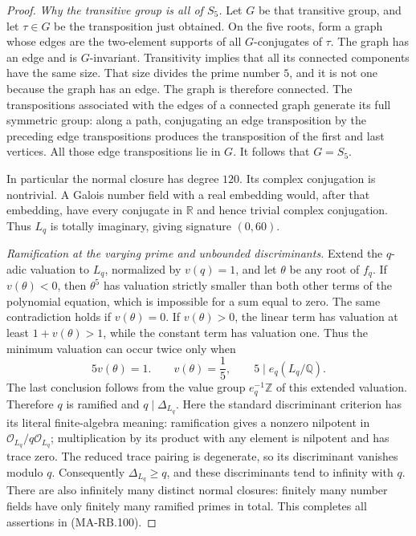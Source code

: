 \begin{proof}
\emph{Why the transitive group is all of \(S_5\).}
Let \(G\) be that transitive group, and let
\(\tau\in G\) be the transposition just obtained.
On the five roots, form a graph whose edges are
the two-element supports of all \(G\)-conjugates
of \(\tau\). The graph has an edge and is
\(G\)-invariant. Transitivity implies that all
its connected components have the same size.
That size divides the prime number \(5\), and
it is not one because the graph has an edge.
The graph is therefore connected.
The transpositions associated with the edges
of a connected graph generate its full symmetric
group: along a path, conjugating an edge transposition
by the preceding edge transpositions produces the
transposition of the first and last vertices.
All those edge transpositions lie in \(G\).
It follows that \(G=S_5\).

In particular the normal closure has degree \(120\).
Its complex conjugation is nontrivial. A Galois
number field with a real embedding would, after
that embedding, have every conjugate in \(\mathbb R\)
and hence trivial complex conjugation.
Thus \(L_q\) is totally imaginary, giving signature
\((0,60)\).

\emph{Ramification at the varying prime and unbounded discriminants.}
Extend the \(q\)-adic valuation to \(L_q\), normalized
by \(v(q)=1\), and let \(\theta\) be any root of \(f_q\).
If \(v(\theta)<0\), then \(\theta^5\) has valuation
strictly smaller than both other terms of the
polynomial equation, which is impossible for a sum
equal to zero. The same contradiction holds if
\(v(\theta)=0\).
If \(v(\theta)>0\), the linear term has valuation
at least \(1+v(\theta)>1\), while the constant
term has valuation one. Thus the minimum valuation
can occur twice only when
\[
                   5v(\theta)=1.
 \qquad
 v(\theta)=\frac15,\qquad
                    5\mid e_q(L_q/\mathbb Q).
 \tag{MA-RB.103}
\]
The last conclusion follows from the value group
\(e_q^{-1}\mathbb Z\) of this extended valuation.
Therefore \(q\) is ramified and \(q\mid\Delta_{L_q}\).
Here the standard discriminant criterion has its
literal finite-algebra meaning: ramification gives
a nonzero nilpotent in \(\mathcal O_{L_q}/q\mathcal O_{L_q}\);
multiplication by its product with any element is
nilpotent and has trace zero. The reduced trace pairing
is degenerate, so its discriminant vanishes modulo \(q\).
Consequently \(\Delta_{L_q}\ge q\), and these
discriminants tend to infinity with \(q\).
There are also infinitely many distinct normal
closures: finitely many number fields have only
finitely many ramified primes in total.
This completes all assertions in (MA-RB.100).


\end{proof}

